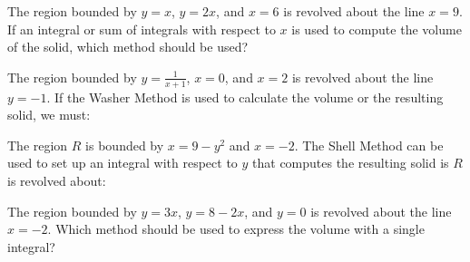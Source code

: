\documentclass{ximera}
\author{Jim Talamo}
\begin{document}
\begin{exercise}
 The region bounded by $y=x$, $y=2x$, and $x=6$ is revolved about the line $x=9$.  If an integral or sum of integrals with respect to $x$ is used to compute the volume of the solid, which method should be used?
 
\begin{multipleChoice}
\end{multipleChoice}

\end{exercise}

\begin{exercise}
 The region bounded by $y=\frac{1}{x+1}$, $x=0$, and $x=2$ is revolved about the line $y=-1$.  If the Washer Method is used to calculate the volume or the resulting solid, we must:
 
\begin{multipleChoice}
\end{multipleChoice}

\end{exercise}

\begin{exercise}
 The region $R$ is bounded by $x=9-y^2$ and $x=-2$.  The Shell Method can be used to set up an integral with respect to $y$ that computes the resulting solid is $R$ is revolved about:
 
 
\begin{multipleChoice}
\end{multipleChoice}

\end{exercise}

\begin{exercise}
 The region bounded by $y=3x$, $y=8-2x$, and $y=0$ is revolved about the line $x=-2$.  Which method should be used to express the volume with a single integral?
 
\begin{multipleChoice}
\end{multipleChoice}

\end{exercise}
\end{document}
